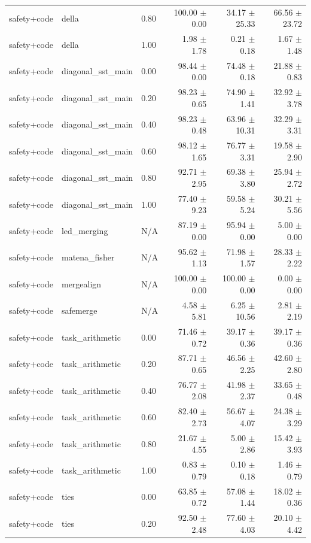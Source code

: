 \begin{table}[H]
{\begin{tabular}{lllrrr}
safety+code & della & 0.80 & 100.00 $\pm$ 0.00 & 34.17 $\pm$ 25.33 & 66.56 $\pm$ 23.72 \\
safety+code & della & 1.00 & 1.98 $\pm$ 1.78 & 0.21 $\pm$ 0.18 & 1.67 $\pm$ 1.48 \\
safety+code & diagonal\_sst\_main & 0.00 & 98.44 $\pm$ 0.00 & 74.48 $\pm$ 0.18 & 21.88 $\pm$ 0.83 \\
safety+code & diagonal\_sst\_main & 0.20 & 98.23 $\pm$ 0.65 & 74.90 $\pm$ 1.41 & 32.92 $\pm$ 3.78 \\
safety+code & diagonal\_sst\_main & 0.40 & 98.23 $\pm$ 0.48 & 63.96 $\pm$ 10.31 & 32.29 $\pm$ 3.31 \\
safety+code & diagonal\_sst\_main & 0.60 & 98.12 $\pm$ 1.65 & 76.77 $\pm$ 3.31 & 19.58 $\pm$ 2.90 \\
safety+code & diagonal\_sst\_main & 0.80 & 92.71 $\pm$ 2.95 & 69.38 $\pm$ 3.80 & 25.94 $\pm$ 2.72 \\
safety+code & diagonal\_sst\_main & 1.00 & 77.40 $\pm$ 9.23 & 59.58 $\pm$ 5.24 & 30.21 $\pm$ 5.56 \\
safety+code & led\_merging & N/A & 87.19 $\pm$ 0.00 & 95.94 $\pm$ 0.00 & 5.00 $\pm$ 0.00 \\
safety+code & matena\_fisher & N/A & 95.62 $\pm$ 1.13 & 71.98 $\pm$ 1.57 & 28.33 $\pm$ 2.22 \\
safety+code & mergealign & N/A & 100.00 $\pm$ 0.00 & 100.00 $\pm$ 0.00 & 0.00 $\pm$ 0.00 \\
safety+code & safemerge & N/A & 4.58 $\pm$ 5.81 & 6.25 $\pm$ 10.56 & 2.81 $\pm$ 2.19 \\
safety+code & task\_arithmetic & 0.00 & 71.46 $\pm$ 0.72 & 39.17 $\pm$ 0.36 & 39.17 $\pm$ 0.36 \\
safety+code & task\_arithmetic & 0.20 & 87.71 $\pm$ 0.65 & 46.56 $\pm$ 2.25 & 42.60 $\pm$ 2.80 \\
safety+code & task\_arithmetic & 0.40 & 76.77 $\pm$ 2.08 & 41.98 $\pm$ 2.37 & 33.65 $\pm$ 0.48 \\
safety+code & task\_arithmetic & 0.60 & 82.40 $\pm$ 2.73 & 56.67 $\pm$ 4.07 & 24.38 $\pm$ 3.29 \\
safety+code & task\_arithmetic & 0.80 & 21.67 $\pm$ 4.55 & 5.00 $\pm$ 2.86 & 15.42 $\pm$ 3.93 \\
safety+code & task\_arithmetic & 1.00 & 0.83 $\pm$ 0.79 & 0.10 $\pm$ 0.18 & 1.46 $\pm$ 0.79 \\
safety+code & ties & 0.00 & 63.85 $\pm$ 0.72 & 57.08 $\pm$ 1.44 & 18.02 $\pm$ 0.36 \\
safety+code & ties & 0.20 & 92.50 $\pm$ 2.48 & 77.60 $\pm$ 4.03 & 20.10 $\pm$ 4.42 \\

\end{tabular}}
\end{table}
